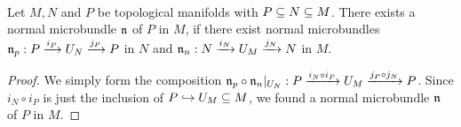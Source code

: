  \\
Let $M, N$ and $P$ be topological manifolds with $P \sub N \sub M$.
There exists a normal microbundle $\bn$ of $P$ in $M$, if
there exist normal microbundles $\bn_p: \bundle{P}{U_N}{i_P}{j_P}$ in $N$ and $\bn_n: \bundle{N}{U_M}{i_N}{j_N}$ in $M$.
\begin{proof}
We simply form the composition $\bn_p \circ \bn_n\restr{U_N}: \bundle{P}{U_M}{i_N \circ i_P}{j_P \circ j_N}$.
Since $i_N \circ i_P$ is just the inclusion of $P \incl U_M \sub M$, we found a normal microbundle $\bn$ of $P$ in $M$.
\end{proof}